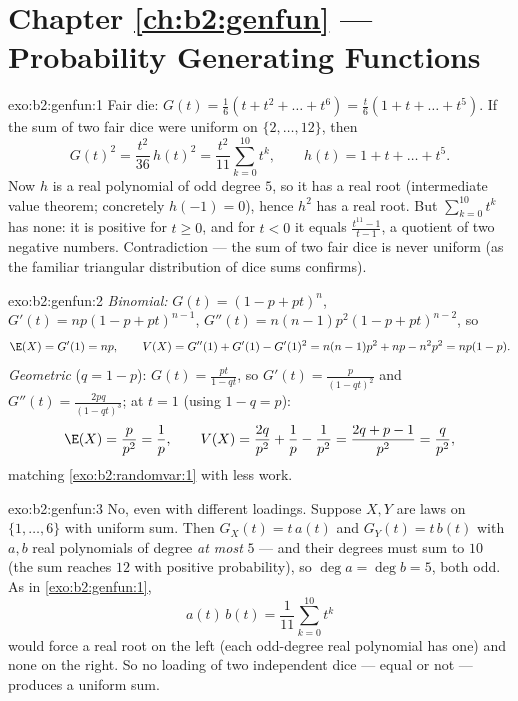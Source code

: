 \section*{Chapter \ref{ch:b2:genfun} --- Probability Generating Functions}

\begin{solution}{exo:b2:genfun:1}
Fair die: $G(t) = \frac16(t + t^2 + \dots + t^6) = \frac t6(1 + t
+ \dots + t^5)$. If the sum of two fair dice were uniform on
$\{2, \dots, 12\}$, then
\[
G(t)^2 = \frac{t^2}{36}\,h(t)^2
= \frac{t^2}{11}\sum_{k=0}^{10}t^k ,
\qquad h(t) = 1 + t + \dots + t^5 .
\]
Now $h$ is a real polynomial of odd degree $5$, so it has a real
root (intermediate value theorem; concretely $h(-1) = 0$), hence
$h^2$ has a real root. But $\sum_{k=0}^{10}t^k$ has none: it is
positive for $t \geq 0$, and for $t < 0$ it equals
$\frac{t^{11} - 1}{t - 1}$, a quotient of two negative numbers.
Contradiction --- the sum of two fair dice is never uniform (as
the familiar triangular distribution of dice sums confirms).
\end{solution}

\begin{solution}{exo:b2:genfun:2}
\emph{Binomial:} $G(t) = (1 - p + pt)^n$, $G'(t) = np(1 - p +
pt)^{n-1}$, $G''(t) = n(n-1)p^2(1 - p + pt)^{n-2}$, so
\[
\E(X) = G'(1) = np,
\qquad
V(X) = G''(1) + G'(1) - G'(1)^2
= n(n-1)p^2 + np - n^2p^2 = np(1-p).
\]
\emph{Geometric} ($q = 1 - p$): $G(t) = \frac{pt}{1 - qt}$, so
$G'(t) = \frac{p}{(1 - qt)^2}$ and $G''(t) = \frac{2pq}{(1 -
qt)^3}$; at $t = 1$ (using $1 - q = p$):
\[
\E(X) = \frac{p}{p^2} = \frac1p,
\qquad
V(X) = \frac{2q}{p^2} + \frac1p - \frac{1}{p^2}
= \frac{2q + p - 1}{p^2}
= \frac{q}{p^2} ,
\]
matching \cref{exo:b2:randomvar:1} with less work.
\end{solution}

\begin{solution}{exo:b2:genfun:3}
No, even with different loadings. Suppose $X, Y$ are laws on
$\{1, \dots, 6\}$ with uniform sum. Then $G_X(t) = t\,a(t)$ and
$G_Y(t) = t\,b(t)$ with $a, b$ real polynomials of degree \emph{at
most} $5$ --- and their degrees must sum to $10$ (the sum reaches
$12$ with positive probability), so $\deg a = \deg b = 5$, both
odd. As in \cref{exo:b2:genfun:1},
\[
a(t)\,b(t) = \frac{1}{11}\sum_{k=0}^{10}t^k
\]
would force a real root on the left (each odd-degree real
polynomial has one) and none on the right. So no loading of two
independent dice --- equal or not --- produces a uniform sum.
\end{solution}

